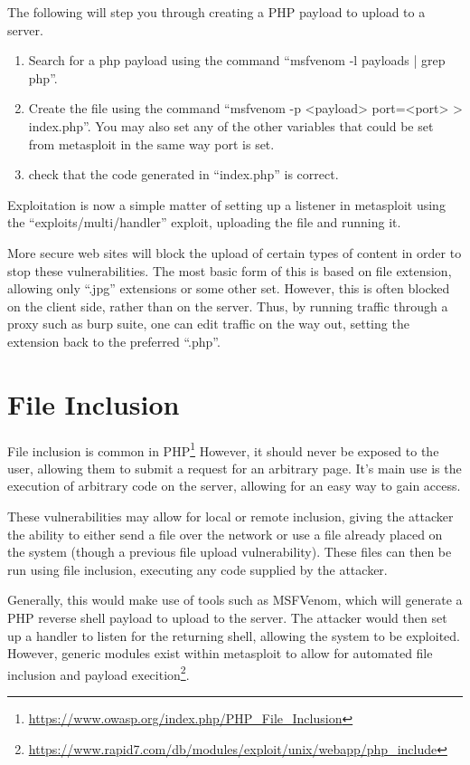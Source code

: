 		The following will step you through creating a PHP payload to upload to a server. 
		\begin{enumerate}
			\item Search for a php payload using the command ``msfvenom -l payloads | grep php''. 
			\item Create the file using the command ``msfvenom -p <payload> port=<port> > index.php''.
				You may also set any of the other variables that could be set from metasploit in the same way port is set.
			\item check that the code generated in ``index.php'' is correct. 
		\end{enumerate}

		Exploitation is now a simple matter of setting up a listener in metasploit using the ``exploits/multi/handler'' exploit, uploading the file and running it.

		More secure web sites will block the upload of certain types of content in order to stop these vulnerabilities. 
		The most basic form of this is based on file extension, allowing only ``.jpg'' extensions or some other set. 
		However, this is often blocked on the client side, rather than on the server. 
		Thus, by running traffic through a proxy such as burp suite, 
		one can edit traffic on the way out, setting the extension back to the preferred ``.php''. 
	\section{File Inclusion}
		File inclusion is common in PHP\footnote{\url{https://www.owasp.org/index.php/PHP\_File\_Inclusion}}
		However, it should never be exposed to the user, allowing them to submit a request for an arbitrary page. 
		It's main use is the execution of arbitrary code on the server, allowing for an easy way to gain access. 

		These vulnerabilities may allow for local or remote inclusion, giving the attacker the ability to either send a file over the network or use a file already placed on the system (though a previous file upload vulnerability). 
		These files can then be run using file inclusion, executing any code supplied by the attacker. 

		Generally, this would make use of tools such as MSFVenom, which will generate a PHP reverse shell payload to upload to the server. 
		The attacker would then set up a handler to listen for the returning shell, allowing the system to be exploited. 
		However, generic modules exist within metasploit to allow for automated file inclusion and payload 
		execition\footnote{\url{https://www.rapid7.com/db/modules/exploit/unix/webapp/php\_include}}.
		

